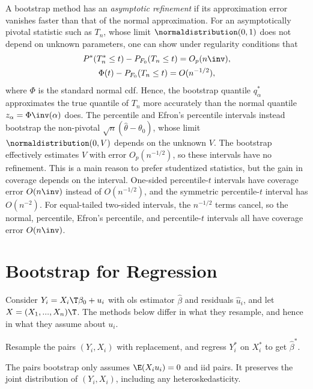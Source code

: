 \documentclass[a4paper,12pt]{article}
\begin{document}
\begin{remark}
	A bootstrap method has an \emph{asymptotic refinement} if its approximation error vanishes faster than that of the normal approximation.
	For an asymptotically pivotal statistic such as $T_n$, whose limit $\normaldistribution(0,1)$ does not depend on unknown parameters,
	one can show under regularity conditions that
	\begin{gather}
		P^*(T_n^*\le t)-P_{F_0}(T_n\le t)=O_p(n\inv), \\
		\Phi(t)-P_{F_0}(T_n\le t)=O(n^{-1/2}),
	\end{gather}
	where $\Phi$ is the standard normal \gls{cdf}.
	Hence, the bootstrap quantile $q_\alpha^*$ approximates the true quantile of $T_n$ more accurately than the normal quantile $z_\alpha=\Phi\inv(\alpha)$ does.
	The percentile and Efron's percentile intervals instead bootstrap the non-pivotal $\sqrt n(\widehat\theta-\theta_0)$,
	whose limit $\normaldistribution(0,V)$ depends on the unknown $V$.
	The bootstrap effectively estimates $V$ with error $O_p(n^{-1/2})$, so these intervals have no refinement.
	This is a main reason to prefer studentized statistics, but the gain in coverage depends on the interval.
	One-sided percentile-$t$ intervals have coverage error $O(n\inv)$ instead of $O(n^{-1/2})$,
	and the symmetric percentile-$t$ interval has $O(n^{-2})$.
	For equal-tailed two-sided intervals, the $n^{-1/2}$ terms cancel,
	so the normal, percentile, Efron's percentile, and percentile-$t$ intervals all have coverage error $O(n\inv)$.
\end{remark}


\section{Bootstrap for Regression}

Consider $Y_i=X_i\T\beta_0+u_i$ with \gls{ols} estimator $\widehat\beta$ and residuals $\widehat u_i$, and let $X=(X_1,...,X_n)\T$.
The methods below differ in what they resample, and hence in what they assume about $u_i$.

\begin{definition}
	Resample the pairs $(Y_i,X_i)$ with replacement, and regress $Y_i^*$ on $X_i^*$ to get $\widehat\beta^*$.
\end{definition}

\begin{remark}
	The pairs bootstrap only assumes $\E(X_iu_i)=0$ and \gls{iid} pairs.
	It preserves the joint distribution of $(Y_i,X_i)$, including any heteroskedasticity.
\end{remark}
\end{document}
